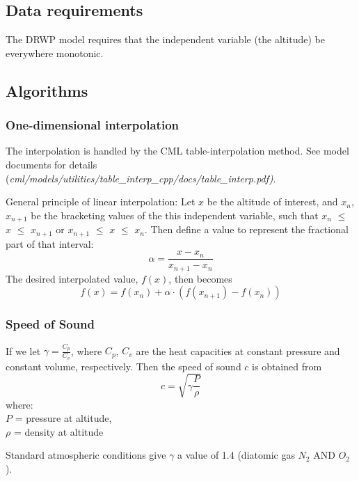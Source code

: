 \documentclass[11pt,fleqn]{report}
\begin{document}
\subsection{Data requirements}

The DRWP model requires that the independent variable (the altitude) be
everywhere monotonic.

\subsection{Algorithms}
\subsubsection{One-dimensional interpolation}
The interpolation is handled by the CML table-interpolation method. See
model documents for details
(\textit{cml/models/utilities/table\_interp\_cpp/docs/table\_interp.pdf)}.

General principle of linear interpolation:
Let $x$ be the altitude of interest, and $x_{n}$, $x_{n+1}$ be the
bracketing values of the this independent variable, such that
$x_{n}$ $\leq$ $x$ $\leq$ $x_{n+1}$ or
$x_{n+1}$ $\leq$ $x$ $\leq$ $x_{n}$.  Then define a value to represent the
fractional part of that interval:
\begin{equation}
  \alpha = \frac{x -  x_{n}} {x_{n+1} - x_{n}}
\end{equation}
The desired interpolated value, $f(x)$, then becomes
\begin{equation}\label{eq:interp}
  f(x) = f(x_{n}) + \alpha \cdot (f(x_{n+1}) - f(x_{n}))
\end{equation}

\subsubsection{Speed of Sound}\label{sec:sos_algo}
If we let $\gamma = \frac{C_{p}}{C_{v}}$, where $C_{p}$, $C_{v}$ are the
heat capacities at constant pressure and constant volume, respectively.
Then the speed of sound $c$ is obtained from
\begin{equation}\label{eq:SOS}
  c = \sqrt{\gamma\frac{P}{\rho}}
\end{equation}
where:\\
\hspace{1cm}$P$ = pressure at altitude,\\
\hspace{1cm}$\rho$ = density at altitude

Standard atmospheric conditions give $\gamma$ a value of 1.4 (diatomic gas
$N_2$ AND $O_2$).
\end{document}

